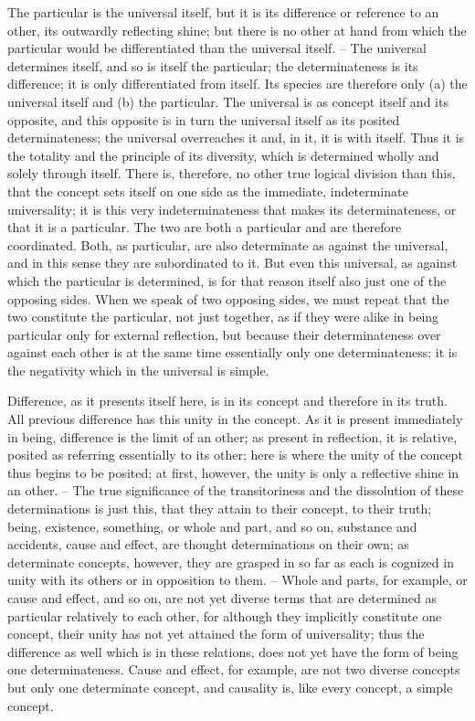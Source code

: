The particular is the universal itself, but it is its difference or reference
to an other, its outwardly reflecting shine; but there is no other at hand from
which the particular would be differentiated than the universal itself. – The
universal determines itself, and so is itself the particular; the determinateness
is its difference; it is only differentiated from itself. Its species are therefore
only (a) the universal itself and (b) the particular. The universal is as concept
itself and its opposite, and this opposite is in turn the universal itself as
its posited determinateness; the universal overreaches it and, in it, it is
with itself. Thus it is the totality and the principle of its diversity, which is
determined wholly and solely through itself.
There is, therefore, no other true logical division than this, that the
concept sets itself on one side as the immediate, indeterminate universality;
it is this very indeterminateness that makes its determinateness, or that it
is a particular. The two are both a particular and are therefore coordinated.
Both, as particular, are also determinate as against the universal, and in
this sense they are subordinated to it. But even this universal, as against
which the particular is determined, is for that reason itself also just one
of the opposing sides. When we speak of two opposing sides, we must
repeat that the two constitute the particular, not just together, as if they
were alike in being particular only for external reflection, but because
their determinateness over against each other is at the same time essentially
only one determinateness; it is the negativity which in the universal is
simple.

Difference, as it presents itself here, is in its concept and therefore in
its truth. All previous difference has this unity in the concept. As it is
present immediately in being, difference is the limit of an other; as present
in reflection, it is relative, posited as referring essentially to its other; here is
where the unity of the concept thus begins to be posited; at first, however,
the unity is only a reflective shine in an other. – The true significance of the
transitoriness and the dissolution of these determinations is just this, that
they attain to their concept, to their truth; being, existence, something, or
whole and part, and so on, substance and accidents, cause and effect, are
thought determinations on their own; as determinate concepts, however,
they are grasped in so far as each is cognized in unity with its others or
in opposition to them. – Whole and parts, for example, or cause and
effect, and so on, are not yet diverse terms that are determined as particular
relatively to each other, for although they implicitly constitute one concept,
their unity has not yet attained the form of universality; thus the difference
as well which is in these relations, does not yet have the form of being
one determinateness. Cause and effect, for example, are not two diverse
concepts but only one determinate concept, and causality is, like every
concept, a simple concept.

